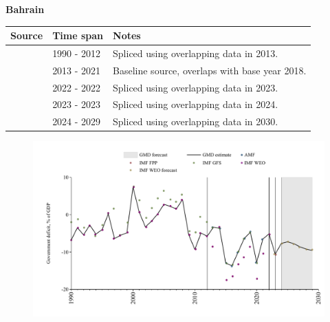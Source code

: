 \documentclass[12pt,a4paper,landscape]{article}
\begin{document}
\begin{adjustbox}{max totalsize={\paperwidth}{\paperheight},center}
\begin{minipage}[t][\textheight][t]{\textwidth}
\vspace*{0.5cm}
{}
\begin{center}
{\Large\bfseries Bahrain}
\end{center}
\vspace{0.5cm}
\begin{table}[H]
\centering
\small
\begin{tabular}{|l|l|l|}
\hline
\textbf{Source} & \textbf{Time span} & \textbf{Notes} \\
\hline
\rowcolor{white}\cite{IMF_WEO}& 1990 - 2012 &Spliced using overlapping data in 2013.\\
\rowcolor{lightgray}\cite{AMF}& 2013 - 2021 &Baseline source, overlaps with base year 2018.\\
\rowcolor{white}\cite{IMF_WEO}& 2022 - 2022 &Spliced using overlapping data in 2023.\\
\rowcolor{lightgray}\cite{IMF_FPP}& 2023 - 2023 &Spliced using overlapping data in 2024.\\
\rowcolor{white}\cite{IMF_WEO_forecast}& 2024 - 2029 &Spliced using overlapping data in 2030.\\
\hline
\end{tabular}
\end{table}
\begin{figure}[H]
\centering
\includegraphics[width=\textwidth,height=0.6\textheight,keepaspectratio]{graphs/BHR_govdef_GDP.pdf}
\end{figure}
\end{minipage}
\end{adjustbox}
\end{document}
